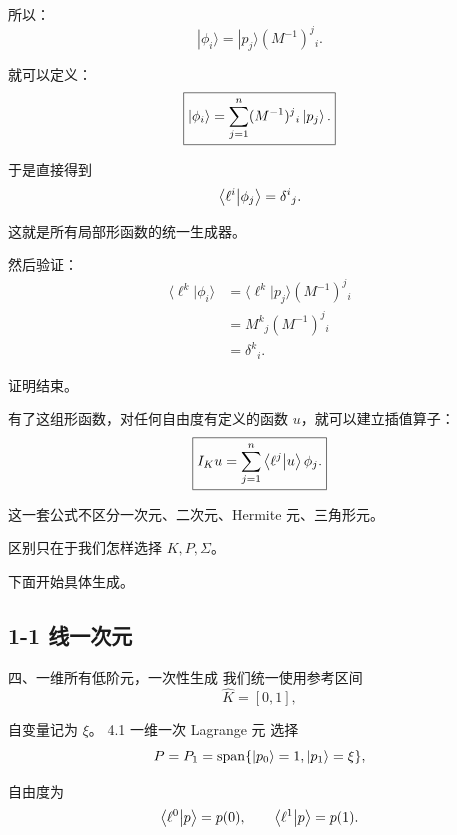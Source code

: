 所以：
\[
    \boxed{
    |\phi_i\rangle
    =|p_j\rangle(M^{-1})^j{}_i.
    }
    \tag{1}
\]

就可以定义：
\[
    \boxed{
        \ket{\phi_i}=\sum_{j=1}^n(M^{-1})^{j}{}_{i}\ket{p_j}.
    }
\]

于是直接得到
\[
    \braket{\ell^i}{\phi_j}=\delta^{i}{}_{j}.
\]

这就是所有局部形函数的统一生成器。

然后验证：
\[
    \begin{aligned}
        \langle\ell^k|\phi_i\rangle
         & =\langle\ell^k|p_j\rangle(M^{-1})^j{}_i \\
         & =M^k{}_j(M^{-1})^j{}_i                  \\
         & =\delta^k{}_i.
    \end{aligned}
\]

证明结束。

有了这组形函数，对任何自由度有定义的函数 \(u\)，就可以建立插值算子：
\[
    \boxed{
        I_Ku=\sum_{j=1}^n\braket{\ell^j}{u}\phi_j.
    }
\]

这一套公式不区分一次元、二次元、Hermite 元、三角形元。

区别只在于我们怎样选择 \(K,P,\Sigma\)。

下面开始具体生成。


\subsection{1-1 线一次元}
四、一维所有低阶元，一次性生成
我们统一使用参考区间
\[
    \widehat K=[0,1],
\]

自变量记为 \(\xi\)。
4.1 一维一次 Lagrange 元
选择
\[
    P=P_1=\operatorname{span}\{\ket{p_0}=1,\ket{p_1}=\xi\},
\]

自由度为
\[
    \braket{\ell^0}{p}=p(0),\qquad \braket{\ell^1}{p}=p(1).
\]

